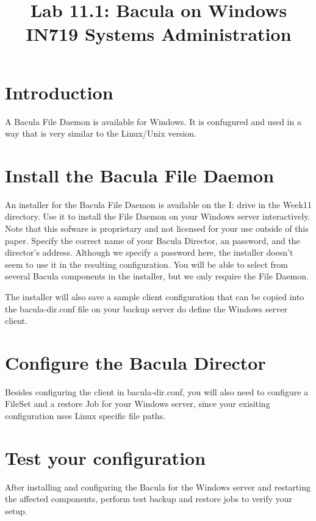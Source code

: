 \documentclass{article}   	%
\title{Lab 11.1:  Bacula on Windows\\ IN719 Systems Administration}
\date{}							%
\begin{document}
\maketitle

\section*{Introduction}
A Bacula File Daemon is available for Windows. It is confugured and used in a way that is very similar to the Linux/Unix version.

\section{Install the Bacula File Daemon}
An installer for the Bacula File Daemon is available on the I: drive in the Week11 directory.  Use it to install the File Daemon on your Windows server interactively.  Note that this sofware is proprietary and not licensed for your use outside of this paper.  Specify the correct name of your Bacula Director, an password, and the director's address.  Although we specify a password here, the installer doesn't seem to use it in the resulting configuration.  You will be able to select from several Bacula components in the installer, but we only require the File Daemon.

The installer will also save a sample client configuration that can be copied into the bacula-dir.conf file on your backup server do define the Windows server client.

\section{Configure the Bacula Director}
Besides configuring the client in bacula-dir.conf, you will also need to configure a FileSet and a restore Job for your Windows server, since your exisiting configuration uses Linux specific file paths.

\section{Test your configuration}
After installing and configuring the Bacula for the Windows server and restarting the affected components, perform test backup and restore jobs to verify your setup.
\end{document}

